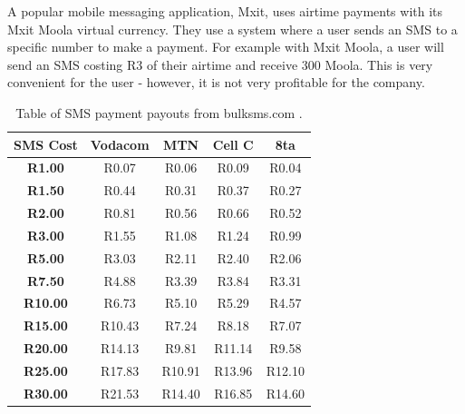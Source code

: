 A popular mobile messaging application, Mxit, uses airtime payments with its Mxit Moola \cite{Mxit} virtual currency. They use a system where a user sends an SMS to a specific number to make a payment. For example with Mxit Moola, a user will send an SMS costing R3 of their airtime and receive 300 Moola. This is very convenient for the user - however, it is not very profitable for the company.

\begin{table}
	\begin{center}
		\caption{Table of SMS payment payouts from bulksms.com \cite{bulksms.com}.} 
		\begin{tabular}	{ | c | c | c | c | c |}
		\hline
		\textbf{SMS Cost} & \textbf{Vodacom} &\textbf{MTN} & \textbf{Cell C} & \textbf{8ta} \\ \hline
		\textbf{R1.00} &	R0.07 &	R0.06 &	R0.09 &	R0.04 \\ \hline 
		\textbf{R1.50} &	R0.44 &	R0.31 &	R0.37 &	R0.27 \\ \hline
		\textbf{R2.00} &	R0.81 &	R0.56 &	R0.66 &	R0.52 \\ \hline
		\textbf{R3.00} &	R1.55 &	R1.08 &	R1.24 &	R0.99 \\ \hline
		\textbf{R5.00} &	R3.03 &	R2.11 &	R2.40 &	R2.06 \\ \hline
		\textbf{R7.50} &	R4.88 &	R3.39 &	R3.84 &	R3.31 \\ \hline
		\textbf{R10.00} & R6.73 & R5.10 & R5.29 & R4.57 \\ \hline
		\textbf{R15.00} & R10.43 & R7.24 & R8.18 & R7.07 \\ \hline
		\textbf{R20.00} & R14.13 & R9.81 & R11.14 & R9.58 \\ \hline
		\textbf{R25.00} & R17.83 & R10.91 & R13.96 & R12.10 \\ \hline
		\textbf{R30.00} & R21.53 & R14.40 &	R16.85 & R14.60 \\ \hline
	 
		\end{tabular}
		
		\label{tbl:sms_prices}
	\end{center}
\end{table}

